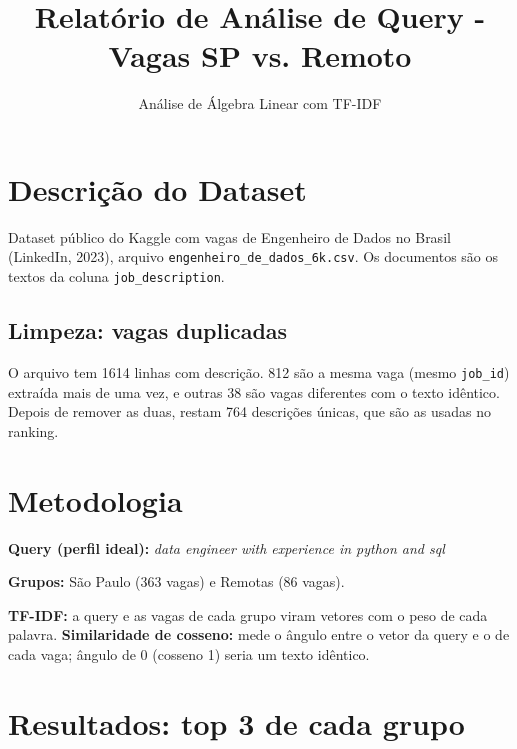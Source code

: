 \documentclass{article}%
\title{Relatório de Análise de Query {-} Vagas SP vs. Remoto}%
\author{Análise de Álgebra Linear com TF{-}IDF}%
\begin{document}
%
\normalsize%
\maketitle%
\section{Descrição do Dataset}%
\label{sec:DescriodoDataset}%
Dataset público do Kaggle com vagas de Engenheiro de Dados no Brasil (LinkedIn, 2023), arquivo \texttt{engenheiro\_de\_dados\_6k.csv}. Os documentos são os textos da coluna \texttt{job\_description}.\par%
\subsection{Limpeza: vagas duplicadas}%
\label{subsec:Limpezavagasduplicadas}%
O arquivo tem 1614 linhas com descrição. 812 são a mesma vaga (mesmo \texttt{job\_id}) extraída mais de uma vez, e outras 38 são vagas diferentes com o texto idêntico. Depois de remover as duas, restam 764 descrições únicas, que são as usadas no ranking.\par

%
\section{Metodologia}%
\label{sec:Metodologia}%
\textbf{Query (perfil ideal):} \textit{data engineer with experience in python and sql}\par\medskip%
\textbf{Grupos:} São Paulo (363 vagas) e Remotas (86 vagas).\par\medskip%
\textbf{TF-IDF:} a query e as vagas de cada grupo viram vetores com o peso de cada palavra. \textbf{Similaridade de cosseno:} mede o ângulo entre o vetor da query e o de cada vaga; ângulo de 0\textdegree{} (cosseno 1) seria um texto idêntico.\par

%
\section{Resultados: top 3 de cada grupo}%
\label{sec:Resultadostop3decadagrupo}%
\end{document}
